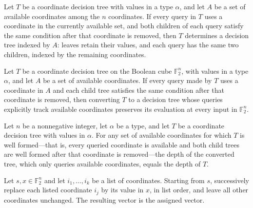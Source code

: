 \begin{definition}
\leanok
{}
Let $T$ be a coordinate decision tree with values in a type $\alpha$, and let $A$ be a
set of available coordinates among the $n$ coordinates. If every query in $T$ uses a
coordinate in the currently available set, and both children of each query satisfy the
same condition after that coordinate is removed, then $T$ determines a decision tree
indexed by $A$: leaves retain their values, and each query has the same two children,
indexed by the remaining coordinates.
\end{definition}

\begin{theorem}
\leanok
{}
Let $T$ be a coordinate decision tree on the Boolean cube $\mathbb{F}_2^n$, with values
in a type $\alpha$, and let $A$ be a set of available coordinates. If every query made
by $T$ uses a coordinate in $A$ and each child tree satisfies the same condition after
that coordinate is removed, then converting $T$ to a decision tree whose queries
explicitly track available coordinates preserves its evaluation at every input in
$\mathbb{F}_2^n$.
\end{theorem}

\begin{theorem}
\leanok
{}
Let $n$ be a nonnegative integer, let $\alpha$ be a type, and let $T$ be a coordinate
decision tree with values in $\alpha$. For any set of available coordinates for which
$T$ is well formed—that is, every queried coordinate is available and both child trees
are well formed after that coordinate is removed—the depth of the converted tree, which
only queries available coordinates, equals the depth of $T$.
\end{theorem}

\begin{definition}
\label{FABL.CoordinateDecisionTree.assignCoordinates}
\leanok
Let $s,x\in\mathbb F_2^n$ and let $i_1,\ldots,i_k$ be a list of coordinates. Starting
from $s$, successively replace each listed coordinate $i_j$ by its value in $x$, in list
order, and leave all other coordinates unchanged. The resulting vector is the assigned
vector.
\end{definition}

